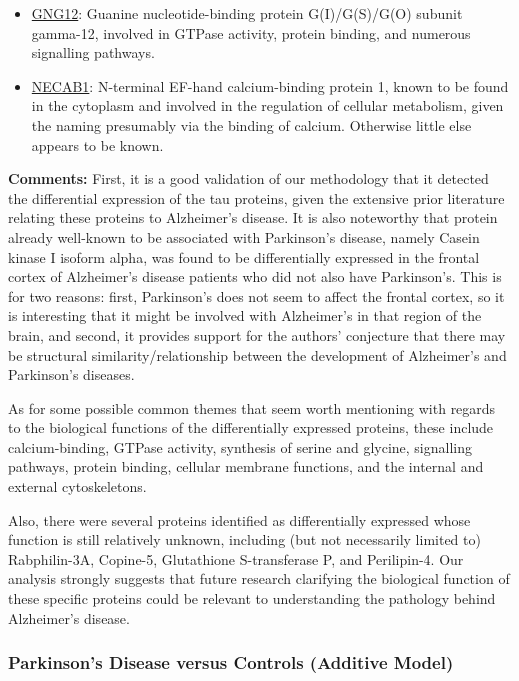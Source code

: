 \begin{itemize}
\item \href{http://www.pantherdb.org/genes/gene.do?acc=HUMAN\%7CHGNC\%3D19663\%7CUniProtKB\%3DQ9UBI6}{GNG12}: Guanine nucleotide-binding protein G(I)/G(S)/G(O) subunit gamma-12, involved in GTPase activity, protein binding, and numerous signalling pathways.
\item \href{http://www.pantherdb.org/genes/gene.do?acc=HUMAN\%7CHGNC\%3D20983\%7CUniProtKB\%3DQ8N987}{NECAB1}: N-terminal EF-hand calcium-binding protein 1, known to be found in the cytoplasm and involved in the regulation of cellular metabolism, given the naming presumably via the binding of calcium. Otherwise little else appears to be known.
\end{itemize}

\textbf{Comments:} First, it is a good validation of our methodology that it detected the differential expression of the tau proteins, given the extensive prior literature relating these proteins to Alzheimer's disease. It is also noteworthy that protein already well-known to be associated with Parkinson's disease, namely Casein kinase I isoform alpha, was found to be differentially expressed in the frontal cortex of Alzheimer's disease patients who did not also have Parkinson's. This is for two reasons: first, Parkinson's does not seem to affect the frontal cortex, so it is interesting that it might be involved with Alzheimer's in that region of the brain, and second, it provides support for the authors' conjecture that there may be structural similarity/relationship between the development of Alzheimer's and Parkinson's diseases.

As for some possible common themes that seem worth mentioning with regards to the biological functions of the differentially expressed proteins, these include calcium-binding, GTPase activity, synthesis of serine and glycine, signalling pathways, protein binding, cellular membrane functions, and the internal and external cytoskeletons.

Also, there were several proteins identified as differentially expressed whose function is still relatively unknown, including (but not necessarily limited to) Rabphilin-3A, Copine-5, Glutathione S-transferase P, and Perilipin-4. Our analysis strongly suggests that future research clarifying the biological function of these specific proteins could be relevant to understanding the pathology behind Alzheimer's disease.

\subsubsection{Parkinson's Disease versus Controls (Additive Model)}

